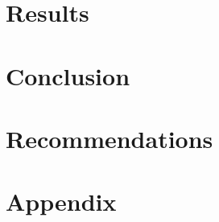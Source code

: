 \documentclass[12pt]{report}
\begin{document}


\chapter{Results}

\chapter{Conclusion}

\chapter{Recommendations}

\nocite{*}   %



\appendix
\chapter{\vspace{-5.5cm}Appendix}
\end{document}
